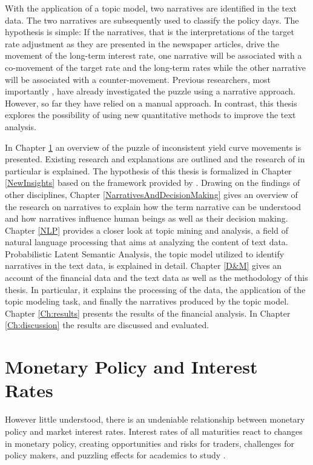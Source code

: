 \documentclass[11pt,a4paper,english,oneside]{book}
\numberwithin{equation}{chapter}
\begin{document}
With the application of a topic model, two narratives are identified in the text data. The two narratives are subsequently used to classify the policy days. The hypothesis is simple: If the narratives, that is the interpretations of the target rate adjustment as they are presented in the newspaper articles, drive the movement of the long-term interest rate, one narrative will be associated with a co-movement of the target rate and the long-term rates while the other narrative will be associated with a counter-movement. Previous researchers, most importantly \citet{Ellingsen.2003}, have already investigated the puzzle using a narrative approach. However, so far they have relied on a manual approach. In contrast, this thesis explores the possibility of using new quantitative methods to improve the text analysis. 

In Chapter \ref{MonetaryPolicy} an overview of the puzzle of inconsistent yield curve movements is presented. Existing research and explanations are outlined and the research of \citet{Ellingsen.2003} in particular is explained. The hypothesis of this thesis is formalized in Chapter \ref{NewInsights} based on the framework provided by \citet{Ellingsen.2003}.
Drawing on the findings of other disciplines, Chapter \ref{NarrativesAndDecisionMaking} gives an overview of the research on narratives to explain how the term narrative can be understood and how narratives influence human beings as well as their decision making.
Chapter \ref{NLP} provides a closer look at topic mining and analysis, a field of natural language
processing that aims at analyzing the content of text data. Probabilistic Latent Semantic Analysis, the topic model utilized to identify narratives in the text data, is explained in detail. 
Chapter \ref{D&M} gives an account of the financial data and the text data as well as the methodology of this thesis. In particular, it explains the processing of the data, the application of the topic modeling task, and finally the narratives produced by the topic model. 
Chapter \ref{Ch:results} presents the results of the financial analysis. In Chapter \ref{Ch:discussion} the results are discussed and evaluated.



\chapter{Monetary Policy and Interest Rates} \label{MonetaryPolicy}
 
\noindent However little understood, there is an undeniable relationship between monetary policy and market interest rates. Interest rates of all maturities react to changes in monetary policy, creating opportunities and risks for traders, challenges for policy makers, and puzzling effects for academics to study \citep[p. 1594]{Ellingsen.2001}. 
\end{document}
